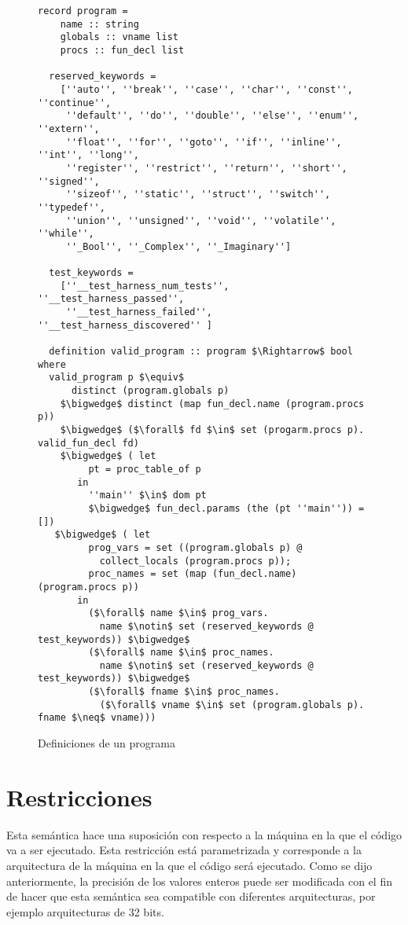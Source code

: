 \begin{figure}
  \begin{lstlisting}[frame=single, mathescape=true]
  record program =
    name :: string
    globals :: vname list
    procs :: fun_decl list

  reserved_keywords =
    [''auto'', ''break'', ''case'', ''char'', ''const'', ''continue'',
     ''default'', ''do'', ''double'', ''else'', ''enum'', ''extern'',
     ''float'', ''for'', ''goto'', ''if'', ''inline'', ''int'', ''long'',
     ''register'', ''restrict'', ''return'', ''short'', ''signed'',
     ''sizeof'', ''static'', ''struct'', ''switch'', ''typedef'',
     ''union'', ''unsigned'', ''void'', ''volatile'', ''while'',
     ''_Bool'', ''_Complex'', ''_Imaginary'']

  test_keywords =
    [''__test_harness_num_tests'', ''__test_harness_passed'',
     ''__test_harness_failed'', ''__test_harness_discovered'' ]

  definition valid_program :: program $\Rightarrow$ bool where
  valid_program p $\equiv$
      distinct (program.globals p)
    $\bigwedge$ distinct (map fun_decl.name (program.procs p))
    $\bigwedge$ ($\forall$ fd $\in$ set (progarm.procs p). valid_fun_decl fd)
    $\bigwedge$ ( let
         pt = proc_table_of p
       in
         ''main'' $\in$ dom pt
         $\bigwedge$ fun_decl.params (the (pt ''main'')) = [])
   $\bigwedge$ ( let
         prog_vars = set ((program.globals p) @
           collect_locals (program.procs p));
         proc_names = set (map (fun_decl.name) (program.procs p))
       in
         ($\forall$ name $\in$ prog_vars.
           name $\notin$ set (reserved_keywords @ test_keywords)) $\bigwedge$
         ($\forall$ name $\in$ proc_names.
           name $\notin$ set (reserved_keywords @ test_keywords)) $\bigwedge$
         ($\forall$ fname $\in$ proc_names.
           ($\forall$ vname $\in$ set (program.globals p). fname $\neq$ vname)))
  \end{lstlisting}

  \caption{Definiciones de un programa}
  \label{fig:prog_def}
\end{figure}


\section{Restricciones}\label{subsection:restrictions_commands}

Esta semántica hace una suposición con respecto a la máquina en la que el código va a ser ejecutado.
Esta restricción está parametrizada y corresponde a la arquitectura de la máquina en la que el código será ejecutado.
Como se dijo anteriormente, la precisión de los valores enteros puede ser modificada con el fin de hacer que esta semántica sea compatible con diferentes arquitecturas, por ejemplo arquitecturas de 32 bits.

